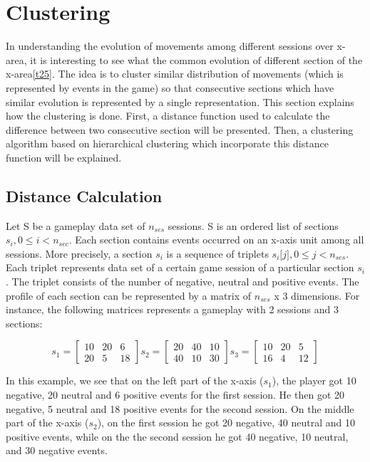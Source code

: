 \section{Clustering}

In understanding the evolution of movements among different sessions over x-area, it is interesting to see what the common evolution of different section of the x-area\ref{t25}. The idea is to cluster similar distribution of movements (which is represented by events in the game) so that consecutive sections which have similar evolution is represented by a single representation. This section explains how the clustering is done. First, a distance function used to calculate the difference between two consecutive section will be presented. Then, a clustering algorithm based on hierarchical clustering which incorporate this distance function will be explained.

\subsection{Distance Calculation}
Let S be a gameplay data set of $n_{ses}$ sessions. S is an ordered list of sections $s_i, 0 \le i < n_{sec}$. Each section contains events occurred on an x-axis unit among all sessions. More precisely, a  section $s_i$ is a sequence of triplets $s_i\lbrack j \rbrack, 0 \le j < n_{ses}$. Each triplet represents data set of a certain game session of a particular section $s_i$. The triplet consists of the number of negative, neutral and positive events. The profile of each section can be represented by a matrix of $n_{ses}$ x 3 dimensions. For instance, the following matrices represents a gameplay with 2 sessions and 3 sections:

\[
\textit{s}_1 = \begin{bmatrix}
  10 & 20 & 6\\
  20 & 5 & 18
\end{bmatrix}
\textit{s}_2 = \begin{bmatrix}
  20 & 40 & 10\\ 
  40 & 10 & 30
\end{bmatrix}
\textit{s}_3 = \begin{bmatrix}
  10 & 20 & 5\\
  16 & 4 & 12 
\end{bmatrix}
\]

In this example, we see that on the left part of the x-axis ($s_1$), the player got 10 negative, 20 neutral and 6 positive events for the first session. He then got 20 negative, 5 neutral and 18 positive events for the second session. On the middle part of the x-axis ($s_2$), on the first session he got 20 negative, 40 neutral and 10 positive events, while on the the second session he got 40 negative, 10 neutral, and 30 negative events.

